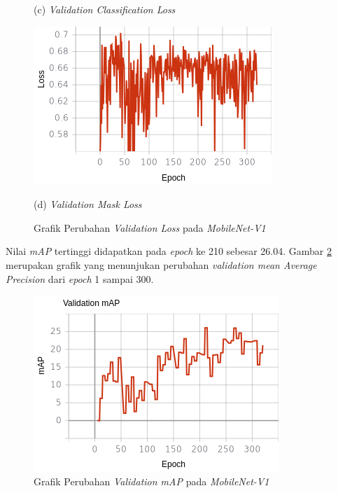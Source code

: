 \begin{figure}[H]
\begin{minipage}{0.45\textwidth}
		\caption*{(c) \textit{Validation Classification Loss}}
	\end{minipage}
	\hfill
	\begin{minipage}{0.45\textwidth}
		\includegraphics[width=\textwidth]{gambar/training_resnet50/tugas-akhir-Page 19 (3).png}
		\caption*{(d) \textit{Validation Mask Loss}}
	\end{minipage}
	\caption{Grafik Perubahan \textit{Validation Loss} pada \textit{MobileNet-V1}}
	\label{fig:mobilenetv1-val}
\end{figure}

Nilai \textit{mAP} tertinggi didapatkan pada \textit{epoch} ke 210 sebesar 26.04. Gambar \ref{fig:mobilenetv1-map} merupakan grafik yang menunjukan perubahan \textit{validation mean Average Precision} dari \textit{epoch} 1 sampai 300.


\begin{figure}[H]
	\centering
	\includegraphics[scale=0.4]{gambar/mobilenetv1-map.png}
	\caption{Grafik Perubahan \textit{Validation mAP} pada \textit{MobileNet-V1}}
	\label{fig:mobilenetv1-map}
\end{figure} 

